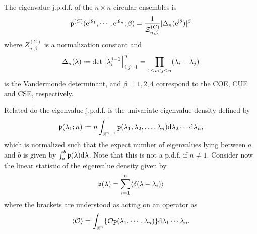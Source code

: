 \begin{ex}
	The eigenvalue j.p.d.f. of the $n \times n$ circular ensembles is 
	\begin{equation}
		\mathtt{p}^{(C)}(\operatorname{e}^{\mathrm{i} \theta_1}, \cdots, \operatorname{e}^{\mathrm{i} \theta_n}; \beta) = \frac{1}{\mathcal{Z}_{n,\beta}^{(C)}} |\Delta_n(\operatorname{e}^{\mathrm{i} \theta})|^\beta
	\end{equation}
	where $Z_{n,\beta}^{(C)}$ is a normalization constant and
	\begin{equation}
		\Delta_n(\lambda) \deff \det\left[ \lambda_i^{j-1}\right]_{i,j=1}^{n} = \prod_{1\leq i<j \leq n} (\lambda_i - \lambda_j)
	\end{equation}
	is the Vandermonde determinant, and $\beta=1,2,4$ correspond to the COE, CUE and CSE, respectively.
\end{ex}

Related do the eigenvalue j.p.d.f. is the univariate eigenvalue density defined by 
\begin{equation}
	\pe(\lambda_1; n) \deff n \int_{\R^{n-1}} \p(\mmany{\lambda}{n}) \dd \lambda_2 \cdots \dd \lambda_n,
\end{equation}
which is normalized such that the expect number of eigenvalues lying between $a$ and $b$ is given by $\int_{a}^{b} \mathfrak{p}(\lambda) \mathrm{d} \lambda$. Note that this is not a p.d.f. if $n\neq1$. Consider now the linear statistic of the eigenvalue density given by
\begin{equation}
	\mathfrak{p}(\lambda) = \sum_{i = 1}^n \langle \delta(\lambda - \lambda_i) \rangle
\end{equation} 
where the brackets are understood as acting on an operator as
\begin{equation}
	\langle \mathcal{O} \rangle = \int_{\mathbb{R}^n} \{\mathcal{O} \mathtt{p}(\lambda_1, \cdots, \lambda_n)\} \mathrm{d} \lambda_1 \cdots \lambda_n.
\end{equation}


